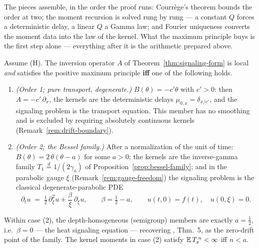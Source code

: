 The pieces assemble, in the order the proof runs: Courr\`ege's theorem bounds the order at
two; the moment recursion is solved rung by rung --- a constant $Q$ forces a deterministic
delay, a linear $Q$ a Gamma law; and Fourier uniqueness converts the moment data into the
law of the kernel. What the maximum principle buys is the first step alone --- everything
after it is the arithmetic prepared above.

\begin{theorem}\label{thm:locality}
Assume (H). The inversion operator $A$ of Theorem~\ref{thm:signaling-form} is local
\emph{and} satisfies the positive maximum principle \textbf{iff} one of the following holds.
\begin{enumerate}
\item \emph{(Order 1; pure transport, degenerate.)} $B(\theta) = -c'\theta$ with $c' > 0$:
then $A = -c'\,\partial_x$, the kernels are the deterministic delays
$\mu_{0,x} = \delta_{x/c'}$, and the signaling problem is the transport equation. This member
has no smoothing and is excluded by requiring absolutely continuous kernels
(Remark~\ref{rem:drift-boundary}).
\item \emph{(Order 2; the Bessel family.)} After a normalization of the unit of time:
$B(\theta) = 2\,\theta(\theta - a)$ for some $a > 0$; the kernels are the
inverse-gamma family $T_1 \stackrel{d}{=} 1/(2\gamma_a)$ of
Proposition~\ref{prop:bessel-family}; and in the parabolic gauge $\xi$
(Remark~\ref{rem:gauge-freedom}) the signaling problem is the classical degenerate-parabolic
PDE
\[
  \partial_t u \;=\; \tfrac12\,\partial_\xi^2 u + \frac{\beta}{\xi}\,\partial_\xi u,
  \qquad \beta = \tfrac12 - a, \qquad u(t,0) = f(t),\quad u(0,\xi) = 0 .
\]
\end{enumerate}
Within case (2), the depth-homogeneous (semigroup) members are exactly $a = \tfrac12$, i.e.\
$\beta = 0$ --- the heat signaling equation --- recovering
, Thm.~5, as the zero-drift point of the family. The kernel
moments in case (2) satisfy $\mathbb{E}\,T_x^{\,n} < \infty$ iff $n < a$.
\end{theorem}

